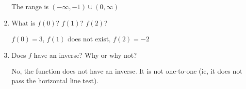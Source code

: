 \documentclass[nooutcomes]{ximera}
\begin{document}
\begin{problem}
\begin{enumerate}
			 \begin{freeResponse}			 
			 The range is $(-\infty ,-1) \cup (0,\infty )$
			 \end{freeResponse}
			 
			 \item What is $f(0)$?  $f(1)$?  $f(2)$?
			 
			  \begin{freeResponse}			 
			 $f(0)=3$, $f(1)$ does not exist, $f(2)=-2$
			 \end{freeResponse}
			 
			 \item Does $f$ have an inverse?  Why or why not?
			 
			  \begin{freeResponse}			 
			 No, the function does not have an inverse.  It is not one-to-one (ie, it does not pass the horizontal line test).
			 \end{freeResponse}
			
			\end{enumerate}
			
	\end{problem}
	
\end{document}
